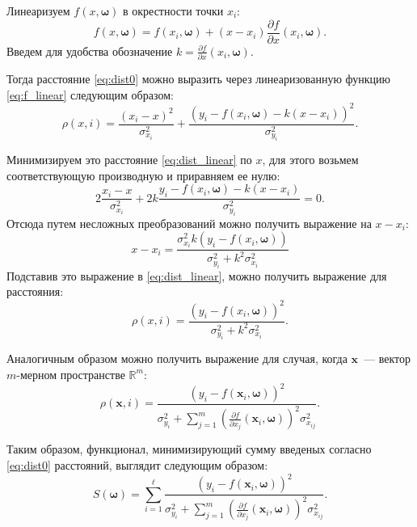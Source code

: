 \documentclass[11pt,a4paper]{article}
\newcommand{\bomega}{\boldsymbol{\omega}}
\begin{document}
Линеаризуем $f(x, \bomega)$ в окрестности точки $x_i$:
\begin{equation}
  f(x, \bomega) = f(x_i, \bomega) + (x - x_i) \frac{\partial f}{\partial x}(x_i, \bomega).
  \label{eq:f_linear}
\end{equation}
Введем для удобства обозначение $k = \frac{\partial f}{\partial x}(x_i, \bomega)$.

Тогда расстояние \eqref{eq:dist0} можно выразить через линеаризованную функцию
\eqref{eq:f_linear} следующим образом:
\begin{equation}
  \rho(x, i) = \frac{(x_i - x)^2}{\sigma_{x_i}^2} + \frac{(y_i - f(x_i, \bomega) - k (x - x_i))^2}{\sigma_{y_i}^2}.
  \label{eq:dist_linear}
\end{equation}

Минимизируем это расстояние \eqref{eq:dist_linear} по $x$, для этого возьмем
соответствующую производную и приравняем ее нулю:
\[
  2\frac{x_i - x}{\sigma_{x_i}^2} + 2k\frac{y_i - f(x_i, \bomega) - k (x - x_i)}{\sigma_{y_i}^2} = 0.
\]
Отсюда путем несложных преобразований можно получить выражение на $x - x_i$:
\[
  x - x_i = \frac{\sigma^2_{x_i} k (y_i - f(x_i, \bomega))}{\sigma^2_{y_i} + k^2 \sigma^2_{x_i}}
\]
Подставив это выражение в \eqref{eq:dist_linear}, можно получить выражение
для расстояния:
\[
  \rho(x, i) = \frac{(y_i - f(x_i, \bomega))^2}{\sigma^2_{y_i} + k^2 \sigma^2_{x_i}}.
\]

Аналогичным образом можно получить выражение для случая, когда $\mathbf{x}$~---
вектор $m$-мерном пространстве $\mathbb{R}^m$:
\[
  \rho(\mathbf{x}, i) = \frac{(y_i - f(\mathbf{x}_i, \bomega))^2}{\sigma_{y_i}^2 + \sum_{j = 1}^m (\frac{\partial f}{\partial x_j}(\mathbf{x}_i, \bomega))^2 \sigma^2_{x_{ij}}}.
\]

Таким образом, функционал, минимизирующий сумму введеных согласно \eqref{eq:dist0}
расстояний, выглядит следующим образом:
\begin{equation}
  S(\bomega) = \sum_{i = 1}^\ell \frac{(y_i - f(\mathbf{x}_i, \bomega))^2}{\sigma_{y_i}^2 + \sum_{j = 1}^m (\frac{\partial f}{\partial x_j}(\mathbf{x}_i, \bomega))^2 \sigma^2_{x_{ij}}}.
  \label{eq:s}
\end{equation}
\end{document}
